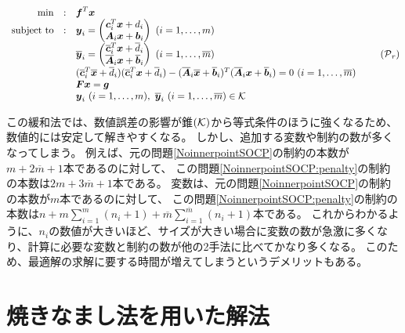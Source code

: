 \documentclass[11pt,a4paper,dvipdfmx,titlepage,uplatex]{jsarticle}
\theoremstyle{mystyle}
\newcommand{\0}{\mathbf{0}}
\def\b{\mbox{\boldmath $b$}}
\def\c{\mbox{\boldmath $c$}}
\def\f{\mbox{\boldmath $f$}}
\def\g{\mbox{\boldmath $g$}}
\def\x{\mbox{\boldmath $x$}}
\def\y{\mbox{\boldmath $y$}}
\def\A{\mbox{\boldmath $A$}}
\def\F{\mbox{\boldmath $F$}}
\def\KC{\mbox{$\cal K$}}
\def\PC{\mbox{$\cal P$}}
\begin{document}
\begin{align}
  \begin{array}{rcl}
    \min & : & \f^T \x \\
    \text{subject to} & : & \y_i = \begin{pmatrix}
    \c_i^T \x + d_i \\  \A_i \x + \b_i
  \end{pmatrix}
  \ (i=1, \ldots, m) \\
  & & \overline{\y}_i = \begin{pmatrix}
  \overline{\c}_i^T \x + \overline{d}_i \\  \overline{\A}_i \x + \overline{\b}_i
\end{pmatrix}
\ (i=1, \ldots, \overline{m}) \\
& & (\overline{\c}_i^T \overline{\x} + \overline{d}_i)(\overline{\c}_i^T \x + \overline{d}_i)
-
(\overline{\A}_i \overline{\x} + \overline{\b}_i)^T(\overline{\A}_i \x + \overline{\b}_i) = 0 \ (i=1, \ldots, \overline{m}) \\
& & \F \x = \g \\
& & \y_i \ (i=1, \ldots, m), \ \overline{\y}_i \ (i=1, \ldots, \overline{m}) \in \KC
\end{array}
\tag{$\PC_r$}
\label{NoinnerpointSOCP:relax}
\end{align}

この緩和法では、数値誤差の影響が錐$(\KC)$から等式条件のほうに強くなるため、
数値的には安定して解きやすくなる。
しかし、追加する変数や制約の数が多くなってしまう。
例えば、元の問題\eqref{NoinnerpointSOCP}の制約の本数が$m + 2 \overline{m} + 1$本であるのに対して、
この問題\eqref{NoinnerpointSOCP:penalty}の制約の本数は$2 m + 3 \overline{m} + 1$本である。
変数は、元の問題\eqref{NoinnerpointSOCP}の制約の本数が$m$本であるのに対して、
この問題\eqref{NoinnerpointSOCP:penalty}の制約の本数は$n + m\sum_{i=1}^m(n_i + 1) + \overline{m} \sum_{i=1}^{\overline{m}} (n_i + 1)$本である。
これからわかるように、$n_i$の数値が大きいほど、サイズが大きい場合に変数の数が急激に多くなり、計算に必要な変数と制約の数が他の2手法に比べてかなり多くなる。
このため、最適解の求解に要する時間が増えてしまうというデメリットもある。

\clearpage

\section{焼きなまし法を用いた解法}\label{sec:SimulatedAnnealing}
\end{document}
